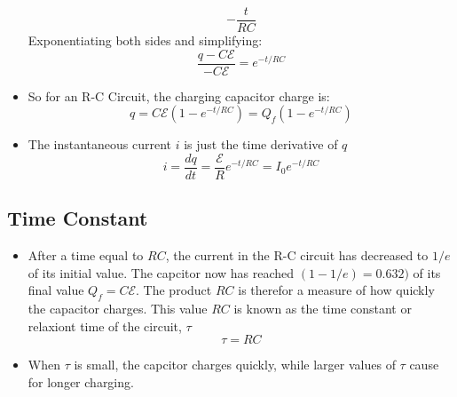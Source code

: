 \documentclass[11pt, a4paper]{article}
\begin{document}
\begin{itemize}
\begin{equation}
           - \frac{t}{RC}
        \end{equation}
        Exponentiating both sides and simplifying:
        \begin{equation}
            \frac{q - C\mathcal{E}}{-C\mathcal{E}} = e^{-t / RC}
        \end{equation}
    \item So for an R-C Circuit, the charging capacitor charge is:
        \begin{equation}
            q = C\mathcal{E}(1 - e^{-t /RC}) = Q_f(1 - e^{-t /RC})
        \end{equation}
    \item The instantaneous current $i$ is just the time derivative of $q$
        \begin{equation}
            i = \frac{dq}{dt} = \frac{\mathcal{E}}{R}e^{-t /RC} =
            I_0 e^{-t /RC}
        \end{equation}
\end{itemize}

\subsection{Time Constant}
\begin{itemize}
    \item After a time equal to $RC$, the current in the R-C circuit has decreased to
        $1 / e$ of its initial value. The capcitor now has reached $(1 - 1 / e) = 0.632)$
        of its final value $Q_f = C\mathcal{E}$. The product $RC$ is therefor a measure
        of how quickly the capacitor charges. This value $RC$ is known as the time
        constant or relaxiont time of the circuit, $\tau$
        \begin{equation}
            \tau = RC
        \end{equation}
    \item When $\tau$ is small, the capcitor charges quickly, while larger values of
        $\tau$ cause for longer charging.
\end{itemize}
\end{document}
